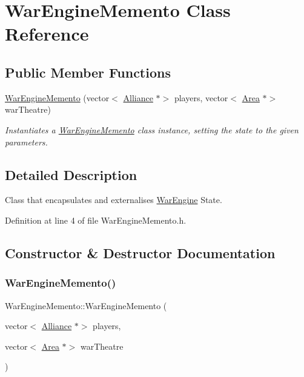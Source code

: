 \hypertarget{classWarEngineMemento}{}\section{War\+Engine\+Memento Class Reference}
\label{classWarEngineMemento}
\subsection*{Public Member Functions}
\begin{DoxyCompactItemize}
\item 
\hyperlink{classWarEngineMemento_a3aaa1bdc205f48cfdc9e60770d6def47}{War\+Engine\+Memento} (vector$<$ \hyperlink{classAlliance}{Alliance} $\ast$$>$ players, vector$<$ \hyperlink{classArea}{Area} $\ast$$>$ war\+Theatre)
\begin{DoxyCompactList}\small\item\em Instantiates a \hyperlink{classWarEngineMemento}{War\+Engine\+Memento} class instance, setting the state to the given parameters. \end{DoxyCompactList}\end{DoxyCompactItemize}


\subsection{Detailed Description}
Class that encapsulates and externalises \hyperlink{classWarEngine}{War\+Engine} State. 

Definition at line 4 of file War\+Engine\+Memento.\+h.



\subsection{Constructor \& Destructor Documentation}
\mbox{\label{classWarEngineMemento_a3aaa1bdc205f48cfdc9e60770d6def47}} 
\subsubsection{\texorpdfstring{War\+Engine\+Memento()}{WarEngineMemento()}}
{\footnotesize\ttfamily War\+Engine\+Memento\+::\+War\+Engine\+Memento (\begin{DoxyParamCaption}\item[{vector$<$ \hyperlink{classAlliance}{Alliance} $\ast$$>$}]{players,  }\item[{vector$<$ \hyperlink{classArea}{Area} $\ast$$>$}]{war\+Theatre }\end{DoxyParamCaption})}



